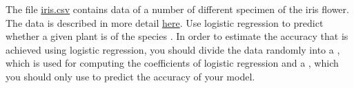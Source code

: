 \exercise 
The file \href{https://github.com/karlstroetmann/Artificial-Intelligence/blob/master/Python/iris.csv}{iris.csv}
contains data of a number of different specimen of the iris flower.  The data is described in more detail 
\href{https://en.wikipedia.org/wiki/Iris_flower_data_set}{here}. 
Use logistic regression to predict whether a given plant is of the species .  In order to
estimate the accuracy that is achieved using logistic regression, you should 
divide the data randomly into a , which is used for computing the coefficients of
logistic regression and a , which you should only use to predict the accuracy of your model.
\eox


